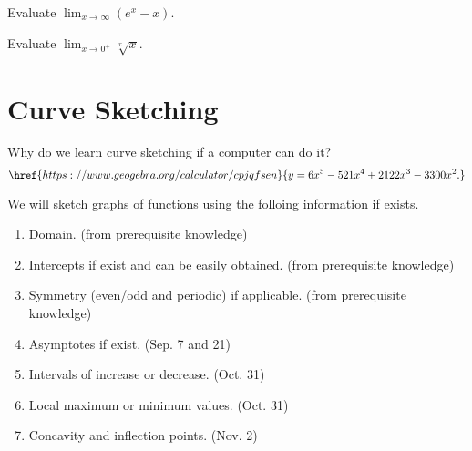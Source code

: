 \documentclass[../main.tex]{subfiles}
\begin{document}
\begin{example}
  Evaluate \(\lim_{x \to \infty} (e^{x} - x)\).
\end{example}
\vfill

\begin{example}
  Evaluate \(\lim_{x \to 0^{+}} \sqrt[x]{x}\).
\end{example}
\vfill

\clearpage
\section{Curve Sketching}
Why do we learn curve sketching if a computer can do it? 
\[
  \href{https://www.geogebra.org/calculator/cpjqfsen}{y = 6x^{5} - 521 x^{4} + 2122 x^{3} - 3300 x^{2}.}
\]

\vfill

We will sketch graphs of functions using the folloing information if exists.
\begin{enumerate}[label={\Alph*}.]
  \item Domain. 
    \hfill
    {\footnotesize (from prerequisite knowledge)}

    \medskip

  \item Intercepts if exist and can be easily obtained.
    \hfill
    {\footnotesize (from prerequisite knowledge)}

    \medskip

  \item Symmetry (even/odd and periodic) if applicable.
    \hfill
    {\footnotesize (from prerequisite knowledge)}

    \medskip

  \item Asymptotes if exist.
    \hfill
    {\footnotesize (Sep. 7 and 21)}

    \medskip

  \item Intervals of increase or decrease.
    \hfill
    {\footnotesize (Oct. 31)}

    \medskip

  \item Local maximum or minimum values.
    \hfill
    {\footnotesize (Oct. 31)}

    \medskip

  \item Concavity and inflection points.
    \hfill
    {\footnotesize (Nov. 2)}

\end{enumerate}
\bigskip
\end{document}
